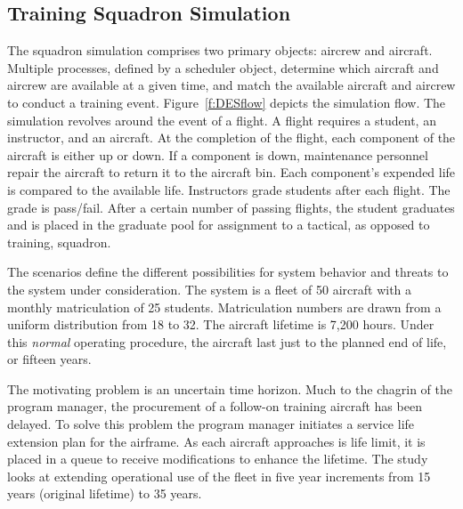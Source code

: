 \documentclass[preprint,12pt]{elsarticle}
\begin{document}
\subsection{Training Squadron Simulation}

The squadron simulation comprises two primary objects: aircrew and
aircraft. Multiple processes, defined by a scheduler object, determine
which aircraft and aircrew are available at a given time, and match
the available aircraft and aircrew to conduct a training event. 
Figure~\ref{f:DESflow} depicts the simulation flow. The simulation
revolves around the event of a flight.  A flight requires a student,
an instructor, and an aircraft. At the completion of the flight, each
component of the aircraft is either up or down. If a component is
down, maintenance personnel repair the aircraft to return it to the
aircraft bin. Each component's expended life is compared to the
available life. Instructors grade students after each flight. The
grade is pass/fail. After a certain number of passing flights, the
student graduates and is placed in the graduate pool for assignment to
a tactical, as opposed to training, squadron.

The scenarios define the different possibilities for system behavior
and threats to the system under consideration. The system is a fleet
of 50 aircraft with a monthly matriculation of
25 students. Matriculation numbers are drawn from a uniform
distribution from 18 to 32.  The aircraft lifetime is 7,200 hours. Under this
\emph{normal} operating procedure, the  
aircraft last just to the planned end of life, or fifteen years.

The motivating problem is an uncertain time horizon. Much to the
chagrin of the program manager, the procurement of a follow-on
training aircraft has been delayed. To solve this problem the program manager
initiates a service life extension plan for the airframe. As each
aircraft approaches is life limit, it is placed in a queue to receive
modifications to enhance the lifetime. The study looks at extending
operational use of the fleet in five year increments from 15 years
(original lifetime) to 35 years.
\end{document}
